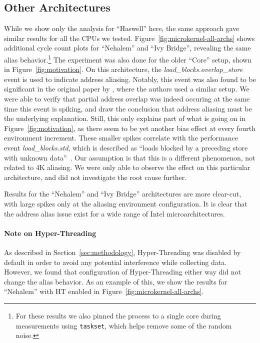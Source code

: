 \documentclass{acm_proc_article-sp}
\begin{document}
\subsection{Other Architectures}
While we show only the analysis for ``Haswell'' here, the same approach gave similar results for all the CPUs we tested.
Figure~\ref{fig:microkernel-all-archs} shows additional cycle count plots for ``Nehalem'' and ``Ivy Bridge'', revealing the same alias behavior.\footnote{For these results we also pinned the process to a single core during measurements using \texttt{taskset}, which helps remove some of the random noise.}
The experiment was also done for the older ``Core'' setup, shown in Figure~\ref{fig:motivation}.
On this architecture, the \emph{load\_blocks.overlap\_store} event is used to indicate address aliasing.
Notably, this event was also found to be significant in the original paper by , where the authors used a similar setup.
We were able to verify that partial address overlap was indeed occuring at the same time this event is spiking, and draw the conclusion that address aliasing must be the underlying explanation.
Still, this only explains part of what is going on in Figure~\ref{fig:motivation}, as there seem to be yet another bias effect at every fourth environment increment.
These smaller spikes correlate with the performance event \emph{load\_blocks.std}, which is described as ``loads blocked by a preceding store with unknown data''~\cite[Table 19-17]{Volume3B}.
Our assumption is that this is a different phenomenon, not related to 4K aliasing.
We were only able to observe the effect on this particular architecture, and did not investigate the root cause further.

Results for the ``Nehalem'' and ``Ivy Bridge'' architectures are more clear-cut, with large spikes only at the aliasing environment configuration.
It is clear that the address alias issue exist for a wide range of Intel microarchitectures.

\paragraph{Note on Hyper-Threading}
As described in Section~\ref{sec:methodology}, Hyper-Threading was disabled by default in order to avoid any potential interference while collecting data.
However, we found that configuration of Hyper-Threading either way did not change the alias behavior.
As an example of this, we show the results for ``Nehalem'' with HT enabled in Figure~\ref{fig:microkernel-all-archs}.
\end{document}

